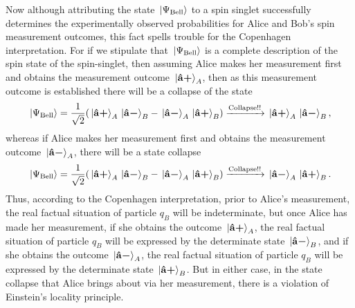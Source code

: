 Now although attributing the state $\ket*{\Psi_{\text{Bell}}}$ to a spin singlet successfully determines the experimentally observed probabilities for  Alice and Bob's spin measurement outcomes, this fact spells trouble for the Copenhagen interpretation. For if we stipulate that $\ket*{\Psi_{\text{Bell}}}$ is a complete description of the spin state of the spin-singlet, then assuming Alice makes her measurement first and obtains the measurement outcome $\ket*{{\vb{\hat{{a}}}\bm{+}}}_A$, then as this measurement outcome is established there will be a collapse of the state
\begin{equation}\label{BellCollapse1}
\ket*{\Psi_{\text{Bell}}}=\frac{1}{\sqrt{2}}(\ket*{{\vb{\hat{{a}}}\bm{+}}}_A\ket*{{\vb{\hat{{a}}}\bm{-}}}_B-\ket*{{\vb{\hat{{a}}}\bm{-}}}_A\ket*{{\vb{\hat{{a}}}\bm{+}}}_B)\xrightarrow{\text{Collapse!!}}\ket*{{\vb{\hat{{a}}}\bm{+}}}_A\ket*{{\vb{\hat{{a}}}\bm{-}}}_B,
\end{equation}
whereas if Alice makes her measurement first and obtains the measurement outcome $\ket*{{\vb{\hat{{a}}}\bm{-}}}_A$, there will be a state collapse
\begin{equation}\label{BellCollapse2}
    \ket*{\Psi_{\text{Bell}}}=\frac{1}{\sqrt{2}}(\ket*{{\vb{\hat{{a}}}\bm{+}}}_A\ket*{{\vb{\hat{{a}}}\bm{-}}}_B-\ket*{{\vb{\hat{{a}}}\bm{-}}}_A\ket*{{\vb{\hat{{a}}}\bm{+}}}_B)\xrightarrow{\text{Collapse!!}}\ket*{{\vb{\hat{{a}}}\bm{-}}}_A\ket*{{\vb{\hat{{a}}}\bm{+}}}_B.
    \end{equation}
Thus, according to the Copenhagen interpretation, prior to Alice's measurement, the real factual situation of particle $q_B$ will be indeterminate, but once Alice has made her measurement, if she obtains the outcome $\ket*{{\vb{\hat{{a}}}\bm{+}}}_A$, the real factual situation of particle $q_B$ will be expressed by the determinate state $\ket*{{\vb{\hat{{a}}}\bm{-}}}_B$, and if she obtains the outcome $\ket*{{\vb{\hat{{a}}}\bm{-}}}_A$, the real factual situation of particle $q_B$ will be expressed by the determinate state $\ket*{{\vb{\hat{{a}}}\bm{+}}}_B$. But in either case, in the state collapse that Alice brings about via her measurement, there is a violation of Einstein's locality principle. 

